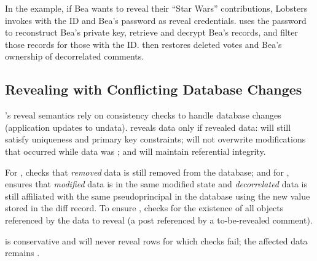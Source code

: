 %
In the example, if Bea wants to reveal their ``Star Wars'' contributions,
Lobsters invokes \sys with the \xx ID and Bea's password as reveal credentials.
%
\sys uses the password to reconstruct Bea's private key, retrieve and decrypt
Bea's \xx records, and filter those records for those with the \xx ID.
%
\sys then restores deleted votes and Bea's ownership of
decorrelated comments.
%

\subsection{Revealing with Conflicting Database Changes}
%
\sys's reveal semantics rely on consistency checks to handle
database changes (\eg application updates to un\xxed data).
%
\sys reveals data only if revealed data: \one{} will still satisfy uniqueness and
primary key constraints; \two{} will not overwrite modifications that occurred
while data was \xxed; and \three{} will maintain referential integrity.

For \one{}, \sys checks that \emph{removed} \xxed data is still removed from the
database;
%
and for \two{}, \sys ensures that \emph{modified} \xxed data is in the same
modified state and \emph{decorrelated}
\xxed data is still affiliated with the same pseudoprincipal in the database
using the new value stored in the diff record.
%
To ensure \three{}, \sys checks for the existence of all objects referenced by the data to reveal
(\eg a post referenced by a to-be-revealed comment).

\sys is conservative and will never reveal rows for which checks fail; the
affected data remains \xxed.

%

